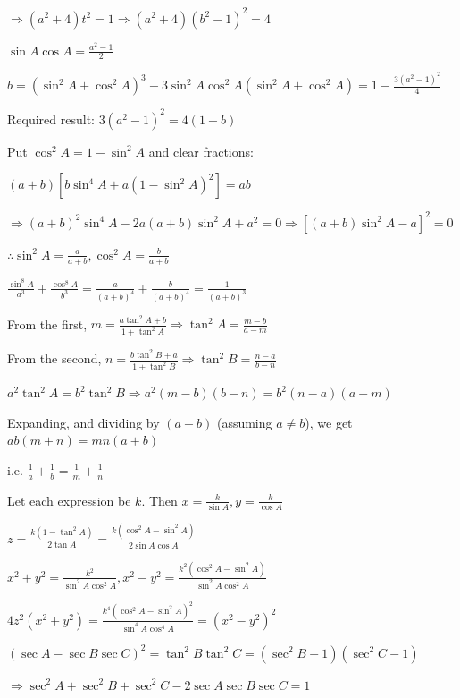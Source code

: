     $\Rightarrow (a^2 + 4)t^2 = 1 \Rightarrow (a^2 + 4)(b^2 - 1)^2 = 4$

\item $\sin A\cos A = \frac{a^2 - 1}{2}$

    $b = (\sin^2 A + \cos^2 A)^3 - 3\sin^2 A\cos^2 A(\sin^2 A + \cos^2 A) = 1 - \frac{3(a^2 - 1)^2}{4}$

    Required result: $3(a^2 - 1)^2 = 4(1 - b)$

\item Put $\cos^2 A = 1 - \sin^2 A$ and clear fractions:

    $(a + b)\left[b\sin^4 A + a(1 - \sin^2 A)^2\right] = ab$

    $\Rightarrow (a + b)^2\sin^4 A - 2a(a + b)\sin^2 A + a^2 = 0 \Rightarrow \left[(a + b)\sin^2 A - a\right]^2 = 0$

    $\therefore \sin^2 A = \frac{a}{a + b}, \cos^2 A = \frac{b}{a + b}$

    $\frac{\sin^8 A}{a^3} + \frac{\cos^8 A}{b^3} = \frac{a}{(a + b)^4} + \frac{b}{(a + b)^4} = \frac{1}{(a + b)^3}$

\item From the first, $m = \frac{a\tan^2 A + b}{1 + \tan^2 A} \Rightarrow \tan^2 A = \frac{m - b}{a - m}$

    From the second, $n = \frac{b\tan^2 B + a}{1 + \tan^2 B} \Rightarrow \tan^2 B = \frac{n - a}{b - n}$

    $a^2\tan^2 A = b^2\tan^2 B \Rightarrow a^2(m - b)(b - n) = b^2(n - a)(a - m)$

    Expanding, and dividing by $(a - b)$ (assuming $a \neq b$), we get $ab(m + n) = mn(a + b)$

    i.e. $\frac{1}{a} + \frac{1}{b} = \frac{1}{m} + \frac{1}{n}$

\item Let each expression be $k$. Then $x = \frac{k}{\sin A}, y = \frac{k}{\cos A}$

    $z = \frac{k(1 - \tan^2 A)}{2\tan A} = \frac{k(\cos^2 A - \sin^2 A)}{2\sin A\cos A}$

    $x^2 + y^2 = \frac{k^2}{\sin^2 A\cos^2 A}, x^2 - y^2 = \frac{k^2(\cos^2 A - \sin^2 A)}{\sin^2 A\cos^2 A}$

    $4z^2(x^2 + y^2) = \frac{k^4(\cos^2 A - \sin^2 A)^2}{\sin^4 A\cos^4 A} = (x^2 - y^2)^2$

\item $(\sec A - \sec B\sec C)^2 = \tan^2 B\tan^2 C = (\sec^2 B - 1)(\sec^2 C - 1)$

    $\Rightarrow \sec^2 A + \sec^2 B + \sec^2 C - 2\sec A\sec B\sec C = 1$

